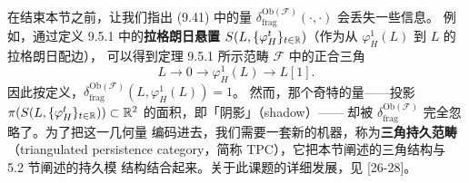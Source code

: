 在结束本节之前，让我们指出 (9.41) 中的量
$\delta^{\mathrm{Ob}(\mathcal F)}_{\mathrm{frag}}(\cdot,\cdot)$ 会丢失一些信息。
例如，通过定义 9.5.1 中的\textbf{拉格朗日悬置}
$S(L,\{\varphi^t_H\}_{t\in\mathbb{R}})$（作为从 $\varphi^1_H(L)$ 到 $L$ 的拉格朗日配边），
可以得到定理 9.5.1 所示范畴 $\mathcal F$ 中的正合三角
\[
L\to0\to\varphi^1_H(L)\to L[1].
\]
因此按定义，$\delta^{\mathrm{Ob}(\mathcal F)}_{\mathrm{frag}}(L,\varphi^1_H(L))=1$。
然而，那个奇特的量——投影
$\pi(S(L,\{\varphi^t_H\}_{t\in\mathbb{R}}))\subset\mathbb{R}^2$ 的面积，即「阴影」（shadow）——
却被 $\delta^{\mathrm{Ob}(\mathcal F)}_{\mathrm{frag}}$ 完全忽略了。为了把这一几何量
编码进去，我们需要一套新的机器，称为\textbf{三角持久范畴}（triangulated
persistence category，简称 TPC），它把本节阐述的三角结构与 5.2 节阐述的持久模
结构结合起来。关于此课题的详细发展，见 [26-28]。


